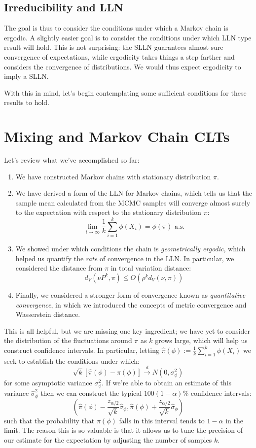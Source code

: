\documentclass[12pt]{article}
\begin{document}
\subsection{Irreducibility and LLN}
The goal is thus to consider the conditions under which a Markov chain is ergodic. A slightly easier goal is to consider the conditions under which  LLN type result 
will hold. This is not surprising: the SLLN guarantees almost sure convergence of expectations, while ergodicity takes things a step farther and considers the convergence
of distributions. We would thus expect ergodicity to imply a SLLN.  

With this in mind, let's begin contemplating some sufficient conditions for these results to hold. 

\section{Mixing and Markov Chain CLTs}
Let's review what we've accomplished so far: 
\begin{enumerate}
\item We have constructed Markov chains with stationary distribution $\pi$. 
\item We have derived a form of the LLN for Markov chains, which tells us that the sample mean calculated from the MCMC samples will converge almost surely 
to the expectation with respect to the stationary distribution $\pi$: 
\[\lim_{i \to \infty} \frac{1}{k} \sum_{i = 1}^{k} \phi(X_i) = \phi(\pi) \text{ a.s.}\]
\item We showed under which conditions the chain is \textit{geometrically ergodic}, which helped us quantify the \textit{rate} of convergence in the LLN. In particular, 
we considered the distance from $\pi$ in total variation distance: 
\[d_V(\nu P^k, \pi) \leq O(\rho^k d_V(\nu, \pi))\]
\item Finally, we considered a stronger form of convergence known as \textit{quantitative convergence}, in which we introduced the concepts of metric convergence 
and Wasserstein distance.
\end{enumerate}

This is all helpful, but we are missing one key ingredient; we have yet to consider the distribution of the fluctuations around $\pi$ as $k$ grows large, which will help us 
construct confidence intervals. In particular, letting $\hat{\pi}(\phi) := \frac{1}{k} \sum_{i = 1}^{k} \phi(X_i)$ we seek to establish the conditions under which: 
\[\sqrt{k}[\hat{\pi}(\phi) - \pi(\phi)] \overset{d}{\to} N(0, \sigma_\phi^2)\]
for some asymptotic variance $\sigma_\phi^2$. If we're able to obtain an estimate of this variance $\hat{\sigma}_\phi^2$ then we can construct the typical 
$100(1 - \alpha)\%$ confidence intervals: 
\[\left(\hat{\pi}(\phi) - \frac{z_{\alpha/2}}{\sqrt{k}}\hat{\sigma}_\phi, \hat{\pi}(\phi) + \frac{z_{\alpha/2}}{\sqrt{k}}\hat{\sigma}_\phi \right)\]
such that the probability that $\pi(\phi)$ falls in this interval tends to $1 - \alpha$ in the limit. The reason this is so valuable is that it allows us to tune the precision 
of our estimate for the expectation by adjusting the number of samples $k$. 
\end{document}
